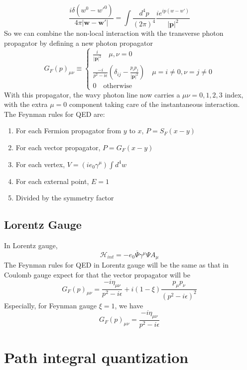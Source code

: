 \documentclass[cyan]{elegantnote}
\begin{document}
\[\frac{i\delta(w^0-w'^0)}{4\pi|\bm{w}-\bm{w}'|} = \int \frac{d^4p}{(2\pi)^4} \frac{ie^{ip(w-w')}}{|\bm{p}|^2}\]
So we can combine the non-local interaction with the transverse photon propagator by defining a new photon propagator
\[G_F(p)_{\mu\nu} \equiv \begin{cases} \frac{i}{|\bm{p}|^2} \quad \mu,\nu=0\\  \frac{-i}{p^2-i\epsilon} \left(\delta_{ij} - \frac{p_ip_j}{|\bm{p}|^2}\right) \quad \mu = i \neq 0, \nu = j \neq 0 \\ 0 \quad \mbox{otherwise} \end{cases} \]
With this propagator, the wavy photon line now carries a $\mu \nu = 0,1,2,3$ index, with the extra $\mu=0$ component taking care of the instantaneous interaction.\\
The Feynman rules for QED are:
\begin{enumerate}
\item For each Fermion propagator from $y$ to $x$, $P = S_F(x-y)$
\item For each vector propagator, $P = G_F(x-y)$
\item For each vertex, $V = (ie_0\gamma^{\mu})\int d^4w$
\item For each external point, $E=1$
\item Divided by the symmetry factor
\end{enumerate}

\subsection{Lorentz Gauge}
\noindent
In Lorentz gauge,
\[\mathcal{H}_{int} = -e_0 \overline{\Psi} \gamma^{\mu} \Psi A_{\mu}\]
The Feynman rules for QED in Lorentz gauge will be the same as that in Coulomb gauge expect for that the vector propagator will be
\[G_F(p)_{\mu\nu}  = \frac{-i\eta_{\mu\nu}}{p^2-i\epsilon} + i(1-\xi)\frac{p_{\mu}p_{\nu}}{(p^2-i\epsilon)^2} \]
Especially, for Feynman gauge $\xi=1$, we have
\[G_F(p)_{\mu\nu}  = \frac{-i\eta_{\mu\nu}}{p^2-i\epsilon} \]

\section{Path integral quantization}
\end{document}
